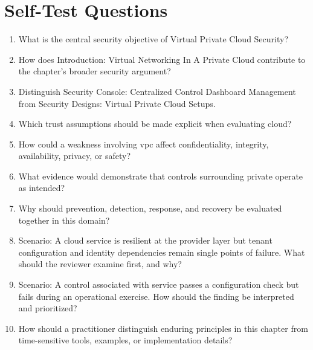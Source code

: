 \documentclass[11pt]{article}
\begin{document}
\section*{Self-Test Questions}
\begin{enumerate}
\item What is the central security objective of Virtual Private Cloud Security?
\item How does Introduction: Virtual Networking In A Private Cloud contribute to the chapter's broader security argument?
\item Distinguish Security Console: Centralized Control Dashboard Management from Security Designs: Virtual Private Cloud Setups.
\item Which trust assumptions should be made explicit when evaluating cloud?
\item How could a weakness involving vpc affect confidentiality, integrity, availability, privacy, or safety?
\item What evidence would demonstrate that controls surrounding private operate as intended?
\item Why should prevention, detection, response, and recovery be evaluated together in this domain?
\item Scenario: A cloud service is resilient at the provider layer but tenant configuration and identity dependencies remain single points of failure. What should the reviewer examine first, and why?
\item Scenario: A control associated with service passes a configuration check but fails during an operational exercise. How should the finding be interpreted and prioritized?
\item How should a practitioner distinguish enduring principles in this chapter from time-sensitive tools, examples, or implementation details?
\end{enumerate}
\end{document}
